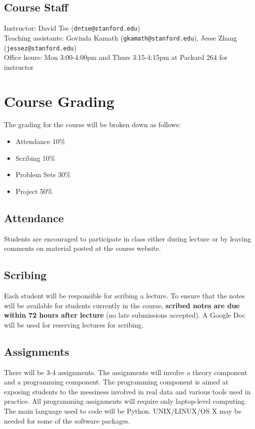\documentclass[11pt,onecolumn]{article}
\begin{document}
\subsection*{Course Staff}
Instructor: David Tse (\texttt{dntse@stanford.edu}) \\
Teaching assistants: Govinda Kamath (\texttt{gkamath@stanford.edu}), Jesse Zhang (\texttt{jessez@stanford.edu}) \\

Office hours: Mon 3:00-4:00pm and Thurs 3:15-4:15pm at Packard 264 for instructor
\pagebreak

\section*{Course Grading}
The grading for the course will be broken down as follows:
\begin{itemize}
	\itemsep0em 
	\item Attendance 10\%
	\item Scribing 10\%
	\item Problem Sets 30\%
	\item Project 50\%
\end{itemize}

\subsection*{Attendance}
Students are encouraged to participate in class either during lecture or by leaving comments on material posted at the course website.

\subsection*{Scribing}
Each student will be responsible for scribing a lecture. To ensure that the notes will be available for students currently in the course, \textbf{scribed notes are due within 72 hours after lecture} (no late submissions accepted). A Google Doc will be used for reserving lectures for scribing.

\subsection*{Assignments}
There will be 3-4 assignments. The assignments will involve a theory component and a programming component. The programming component is aimed at exposing students to the messiness involved in real data and various tools used in practice. All programming assignments will require only laptop-level computing. The main language used to code will be Python. UNIX/LINUX/OS X may be needed for some of the software packages.
\end{document}
